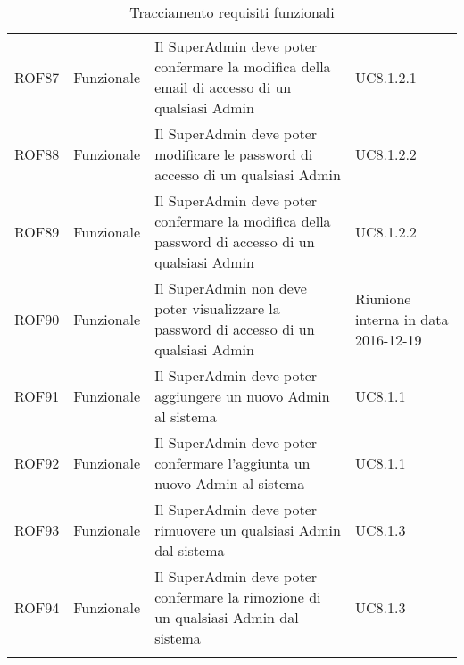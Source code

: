 \documentclass[../AnalisiDeiRequisiti_v3.0.0.tex]{subfiles}
\begin{document}
\begin{longtable}{p{2.5cm}!{\VRule[1pt]}p{2.5cm}!{\VRule[1pt]}p{5cm}!{\VRule[1pt]}p{2.5cm}}
	ROF87&Funzionale\newline  & Il SuperAdmin deve poter confermare la modifica della email di accesso di un qualsiasi Admin & UC8.1.2.1 \\
	ROF88&Funzionale\newline  & Il SuperAdmin deve poter modificare le password di accesso di un qualsiasi Admin & UC8.1.2.2 \\
	ROF89&Funzionale\newline  & Il SuperAdmin deve poter confermare la modifica della password di accesso di un qualsiasi Admin & UC8.1.2.2 \\
	ROF90&Funzionale\newline  & Il SuperAdmin non deve poter visualizzare la password di accesso di un qualsiasi Admin & Riunione interna in data 2016-12-19 \\
	ROF91&Funzionale\newline  & Il SuperAdmin deve poter aggiungere un nuovo Admin al sistema & UC8.1.1 \\
	ROF92&Funzionale\newline  & Il SuperAdmin deve poter confermare l'aggiunta un nuovo Admin al sistema & UC8.1.1 \\
	ROF93&Funzionale\newline  & Il SuperAdmin deve poter rimuovere un qualsiasi Admin dal sistema & UC8.1.3 \\
	ROF94&Funzionale\newline  & Il SuperAdmin deve poter confermare la rimozione di un qualsiasi Admin dal sistema & UC8.1.3 \\
	\caption{Tracciamento requisiti funzionali}
	\end{longtable}

	\newpage
\end{document}
